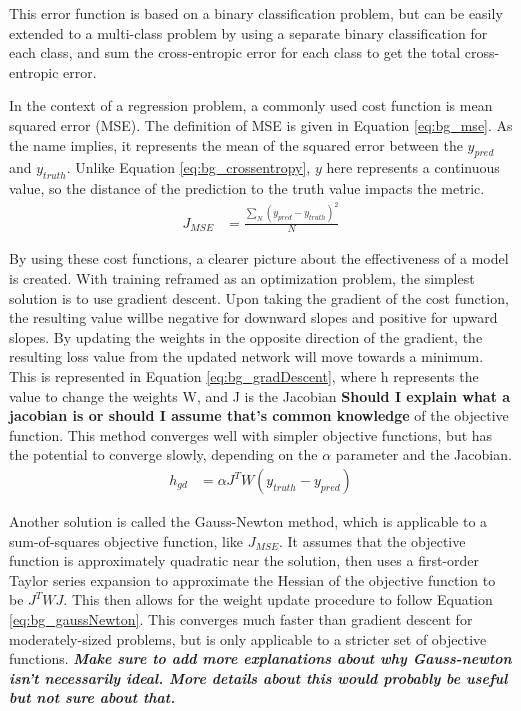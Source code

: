 	\par This error function is based on a binary classification problem, but can be easily extended to a multi-class problem by using a separate binary classification for each class, and sum the cross-entropic error for each class to get the total cross-entropic error.  
	\par In the context of a regression problem, a commonly used cost function is mean squared error (MSE). The definition of MSE is given in Equation \ref{eq:bg_mse}. As the name implies, it represents the mean of the squared error between the $y_{pred}$ and $y_{truth}$. Unlike Equation \ref{eq:bg_crossentropy}, $y$ here represents a continuous value, so the distance of the prediction to the truth value impacts the metric. 
	\begin{align}
		J_{MSE} &= \frac{\sum_N (y_{pred}-y_{truth})^2}{N} \label{eq:bg_mse}
	\end{align}
	\par By using these cost functions, a clearer picture about the effectiveness of a model is created. With training reframed as an optimization problem, the simplest solution is to use gradient descent. Upon taking the gradient of the cost function, the resulting value willbe negative for downward slopes and positive for upward slopes. By updating the weights in the opposite direction of the gradient, the resulting loss value from the updated network will move towards a minimum. This is represented in Equation \ref{eq:bg_gradDescent}, where h represents the value to change the weights W, and J is the Jacobian \textbf{ Should I explain what a jacobian is or should I assume that's common knowledge} of the objective function. This method converges well with simpler objective functions, but has the potential to converge slowly, depending on the $\alpha$ parameter and the Jacobian.
	\begin{align}
		h_{gd} &= \alpha J^T W(y_{truth}-y_{pred}) \label{eq:bg_gradDescent}
	\end{align}
	\par Another solution is called the Gauss-Newton method, which is applicable to a sum-of-squares objective function, like $J_{MSE}$. It assumes that the objective function is approximately quadratic near the solution, then uses a first-order Taylor series expansion to approximate the Hessian of the objective function to be $J^TWJ$. This then allows for the weight update procedure to follow Equation \ref{eq:bg_gaussNewton}. This converges much faster than gradient descent for moderately-sized problems, but is only applicable to a stricter set of objective functions. \textbf{\textit{Make sure to add more explanations about why Gauss-newton isn't necessarily ideal. More details about this would probably be useful but not sure about that.}}
